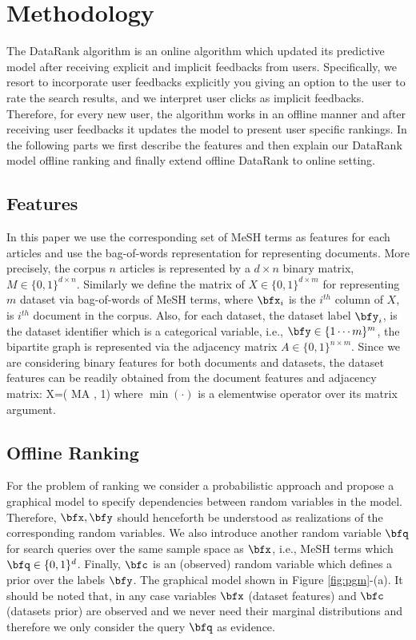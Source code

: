 \documentclass{amia}
\begin{document}
\section{Methodology} \label{sec:methodology}
The DataRank algorithm is an online algorithm which updated its predictive model after receiving explicit and implicit feedbacks from users. Specifically, we resort to incorporate user feedbacks explicitly you giving an option to the user to rate the search results, and we interpret user clicks as implicit feedbacks. Therefore, for every new user, the algorithm works in an offline manner and after receiving user feedbacks it updates the model to present user specific rankings. In the following parts we first describe the features and then explain our DataRank model offline ranking and finally extend offline DataRank to online setting.

\subsection{Features}
In this paper we use the corresponding set of MeSH terms as features for each articles and use the bag-of-words representation for representing documents. More precisely, the corpus $n$ articles is represented by a $d \times n$ binary matrix, $M\in \{0,1\}^{d\times n}$. Similarly we define the matrix of $X\in \{0,1\}^{d\times m}$ for representing $m$ dataset via bag-of-words of MeSH terms, where $\bfx_i$ is the $i^{th}$ column of $X$, is $i^{th}$ document in the corpus. Also, for each dataset, the dataset  label $\bfy_i$, is the dataset identifier which is a categorical variable, i.e., $\bfy \in \{{1\cdots m}\}^m$, the bipartite graph is represented via the adjacency matrix $A\in \{0,1\}^{n\times m}$. Since we are considering binary features for both documents and datasets, the dataset features can be readily obtained from the document features and adjacency matrix:
\beq
X=\min( MA , 1)
\eeq
where $\min(\cdot)$ is a elementwise operator over its matrix argument.

\subsection{Offline Ranking}
For the problem of ranking we consider a probabilistic approach and propose a graphical model to specify dependencies between random variables in the model. Therefore, $\bfx, \bfy$ should henceforth be understood as realizations of the corresponding random variables.
We also introduce another random variable $\bfq$ for search queries over the same sample space as $\bfx$, i.e., MeSH terms which $\bfq \in\{0,1\}^{d}$.  Finally, $\bfc$ is an (observed) random variable which defines a prior over the labels $\bfy$.
The graphical model shown in Figure \ref{fig:pgm}-(a). It should be noted that, in any case variables $\bfx$ (dataset features) and $\bfc$ (datasets prior) are observed and we never need their marginal distributions and therefore we only consider the query $\bfq$ as evidence.
\end{document}
